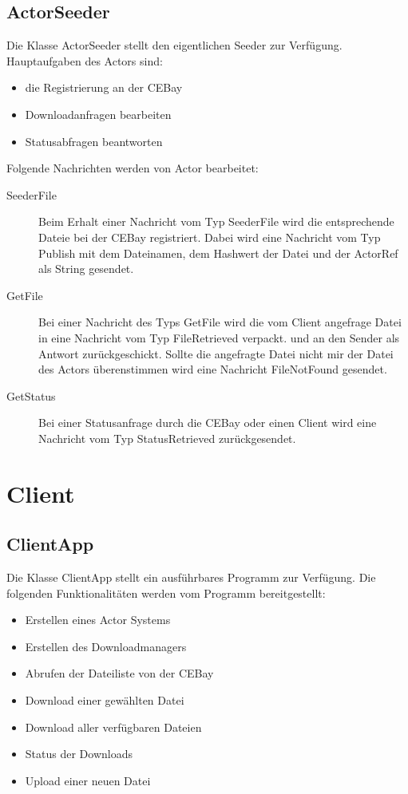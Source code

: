 \documentclass{scrartcl}
\begin{document}
\subsection{ActorSeeder}
\label{sec:orge4b8ee0}
Die Klasse ActorSeeder stellt den eigentlichen Seeder zur
Verfügung. Hauptaufgaben des Actors sind:
\begin{itemize}
\item die Registrierung an der CEBay
\item Downloadanfragen bearbeiten
\item Statusabfragen beantworten
\end{itemize}

Folgende Nachrichten werden von Actor bearbeitet:
\begin{description}
\item[{SeederFile}] Beim Erhalt einer Nachricht vom Typ SeederFile wird
die entsprechende Dateie bei der CEBay registriert. Dabei wird
eine Nachricht vom Typ Publish mit dem Dateinamen, dem Hashwert
der Datei und der ActorRef als String gesendet.
\item[{GetFile}] Bei einer Nachricht des Typs GetFile wird die vom Client
angefrage Datei in eine Nachricht vom Typ FileRetrieved
verpackt. und an den Sender als Antwort zurückgeschickt. Sollte
die angefragte Datei nicht mir der Datei des Actors überenstimmen
wird eine Nachricht FileNotFound gesendet.
\item[{GetStatus}] Bei einer Statusanfrage durch die CEBay oder einen
Client wird eine Nachricht vom Typ StatusRetrieved zurückgesendet.
\end{description}
\newpage
\section{Client}
\label{sec:orgc30708e}

\subsection{ClientApp}
\label{sec:org3cdccec}
Die Klasse ClientApp stellt ein ausführbares Programm zur
Verfügung. Die folgenden Funktionalitäten werden vom Programm
bereitgestellt:
\begin{itemize}
\item Erstellen eines Actor Systems
\item Erstellen des Downloadmanagers
\item Abrufen der Dateiliste von der CEBay
\item Download einer gewählten Datei
\item Download aller verfügbaren Dateien
\item Status der Downloads
\item Upload einer neuen Datei
\end{itemize}
\end{document}
